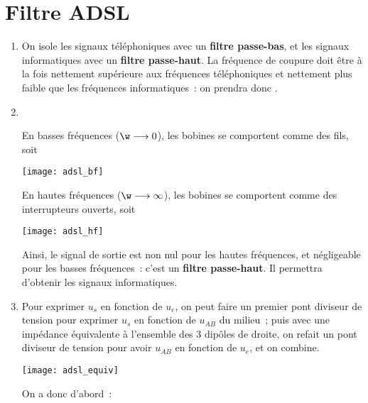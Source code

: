 \documentclass[a4paper, 12pt, final, garamond]{book}
\begin{document}
\section{Filtre ADSL}
\begin{enumerate}
    \item On isole les signaux téléphoniques avec un \textbf{filtre passe-bas},
        et les signaux informatiques avec un \textbf{filtre passe-haut}. La
        fréquence de coupure doit être à la fois nettement supérieure aux
        fréquences téléphoniques et nettement plus faible que les fréquences
        informatiques~: on prendra donc .
    \item ~

        \vspace{-24pt}
        \begin{minipage}{0.45\linewidth}
            En basses fréquences ($\w \longrightarrow 0$), les bobines se
            comportent comme des fils, soit
            \begin{center}
                \texttt{[image: adsl\_bf]}
            \end{center}
        \end{minipage}
        \hfill
        \vrule
        \hfill
        \begin{minipage}{0.45\linewidth}
            En hautes fréquences ($\w \longrightarrow \infty$), les bobines se
            comportent comme des interrupteurs ouverts, soit
            \begin{center}
                \texttt{[image: adsl\_hf]}
            \end{center}
        \end{minipage}
        Ainsi, le signal de sortie est non nul pour les hautes fréquences, et
        négligeable pour les basses fréquences~: c'est un \textbf{filtre
        passe-haut}. Il permettra d'obtenir les signaux informatiques.
    \item Pour exprimer $u_s$ en fonction de $u_e$, on peut faire un premier
        pont diviseur de tension pour exprimer $u_s$ en fonction de $u_{AB}$ du
        milieu~; puis avec une impédance équivalente à l'ensemble des 3 dipôles
        de droite, on refait un pont diviseur de tension pour avoir $u_{AB}$ en
        fonction de $u_e$, et on combine.
        \begin{center}
            \texttt{[image: adsl\_equiv]}
        \end{center}
        On a donc d'abord~:

\end{enumerate}
\end{document}
